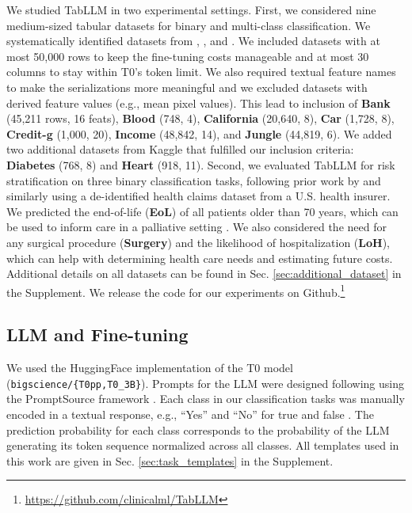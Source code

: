 We studied TabLLM in two experimental settings. First, we considered nine medium-sized tabular datasets for binary and multi-class classification. We systematically identified datasets from \cite{kadra2021well}, \cite{grinsztajn_why_2022}, and \cite{borisov_deep_2022}. We included datasets with at most 50,000 rows to keep the fine-tuning costs manageable and at most 30 columns to stay within T0's token limit. We also required textual feature names to make the serializations more meaningful and we excluded datasets with derived feature values (e.g., mean pixel values). This lead to inclusion of \textbf{Bank} (45,211 rows, 16 feats), \textbf{Blood} (748, 4), \textbf{California} (20,640, 8), \textbf{Car} (1,728, 8), \textbf{Credit-g} (1,000, 20), \textbf{Income} (48,842, 14), and \textbf{Jungle} (44,819, 6). We added two additional datasets from Kaggle that fulfilled our inclusion criteria: \textbf{Diabetes} (768, 8) and \textbf{Heart} (918, 11). Second, we evaluated TabLLM for risk stratification on three binary classification tasks, following prior work by \citet{kodialam_deep_2020} and similarly using a de-identified health claims dataset from a U.S. health insurer. We predicted the end-of-life (\textbf{EoL}) of all patients older than 70 years, which can be used to inform care in a palliative setting \citep{avati2018improving}. We also considered the need for any surgical procedure (\textbf{Surgery}) and the likelihood of hospitalization (\textbf{LoH}), which can help with determining health care needs and estimating future costs. Additional details on all datasets can be found in Sec. \ref{sec:additional_dataset} in the Supplement. We release the code for our experiments on Github.\footnote{\url{https://github.com/clinicalml/TabLLM}}

\subsection{LLM and Fine-tuning} We used the HuggingFace implementation of the T0 model (\texttt{\small bigscience/\{T0pp,T0\_3B\}}).
Prompts for the LLM were designed following \citet{sanh_multitask_2021} using the PromptSource framework \citep{bach_promptsource_2022}. Each class in our classification tasks was manually encoded in a textual response, e.g., ``Yes'' and ``No'' for true and false \citep{sanh_multitask_2021}. The prediction probability for each class corresponds to the probability of the LLM generating its token sequence normalized across all classes. All templates used in this work are given in Sec. \ref{sec:task_templates} in the Supplement.

